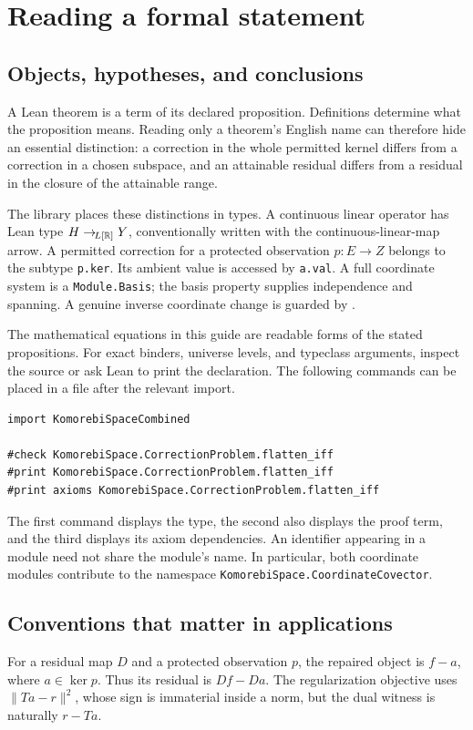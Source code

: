 \documentclass[11pt]{article}
\newcommand{\leanname}[1]{{\small\ttfamily\nolinkurl{#1}}}
\newcommand{\leanexpr}[1]{{\small\code{#1}}}
\newcommand{\guidechapter}[1]{\par\Needspace{8\baselineskip}\section{#1}}
\begin{document}
\clearpage
\tableofcontents
\clearpage

\guidechapter{Reading a formal statement}
\subsection{Objects, hypotheses, and conclusions}
A Lean theorem is a term of its declared proposition. Definitions determine what the proposition means. Reading only a theorem's English name can therefore hide an essential distinction: a correction in the whole permitted kernel differs from a correction in a chosen subspace, and an attainable residual differs from a residual in the closure of the attainable range.

The library places these distinctions in types. A continuous linear operator has Lean type $H\to_{\!L[\mathbb R]}Y$, conventionally written with the continuous-linear-map arrow. A permitted correction for a protected observation $p:E\to Z$ belongs to the subtype \leanname{p.ker}. Its ambient value is accessed by \leanname{a.val}. A full coordinate system is a \leanname{Module.Basis}; the basis property supplies independence and spanning. A genuine inverse coordinate change is guarded by \leanexpr{IsUnit C}.

The mathematical equations in this guide are readable forms of the stated propositions. For exact binders, universe levels, and typeclass arguments, inspect the source or ask Lean to print the declaration. The following commands can be placed in a file after the relevant import.
\begin{verbatim}
import KomorebiSpaceCombined

#check KomorebiSpace.CorrectionProblem.flatten_iff
#print KomorebiSpace.CorrectionProblem.flatten_iff
#print axioms KomorebiSpace.CorrectionProblem.flatten_iff
\end{verbatim}
The first command displays the type, the second also displays the proof term, and the third displays its axiom dependencies. An identifier appearing in a module need not share the module's name. In particular, both coordinate modules contribute to the namespace \leanname{KomorebiSpace.CoordinateCovector}.

\subsection{Conventions that matter in applications}
For a residual map $D$ and a protected observation $p$, the repaired object is $f-a$, where $a\in\ker p$. Thus its residual is $Df-Da$. The regularization objective uses $\|Ta-r\|^2$, whose sign is immaterial inside a norm, but the dual witness is naturally $r-Ta$.
\end{document}

